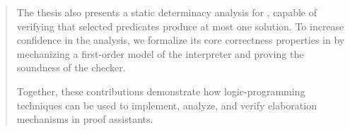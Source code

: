 \begin{ResumeMotsCles}
\begin{abstract}
The thesis also presents a static determinacy analysis for \elpi, capable of
verifying that selected predicates produce at most one solution. To increase
confidence in the analysis, we formalize its core correctness properties in \rocq
by mechanizing a first-order model of the \elpi interpreter and proving the
soundness of the checker.

Together, these contributions demonstrate how logic-programming techniques can
be used to implement, analyze, and verify elaboration mechanisms in proof
assistants.
\end{abstract}

\end{ResumeMotsCles}





